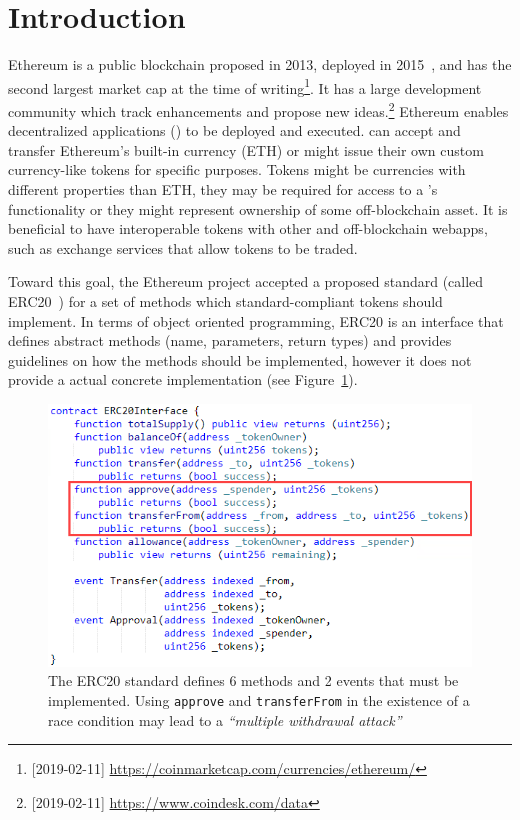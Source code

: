 
\section{Introduction}



Ethereum is a public blockchain proposed in 2013, deployed in 2015~\cite{Ref00}, and has the second largest market cap at the time of writing\footnote{[2019-02-11] \url{https://coinmarketcap.com/currencies/ethereum/}}. It has a large development community which track enhancements and propose new ideas.\footnote{[2019-02-11] \url{https://www.coindesk.com/data}} Ethereum enables decentralized applications (\dapps) to be deployed and executed. \dapps can accept and transfer Ethereum's built-in currency (ETH) or might issue their own custom currency-like tokens for specific purposes. Tokens might be currencies with different properties than ETH, they may be required for access to a \dapp's functionality or they might represent ownership of some off-blockchain asset. It is beneficial to have interoperable tokens with other \dapps and off-blockchain webapps, such as exchange services that allow tokens to be traded.

Toward this goal, the Ethereum project accepted a proposed standard (called ERC20~\cite{Ref08}) for a set of methods which standard-compliant tokens should implement. In terms of object oriented programming, ERC20 is an interface that defines abstract methods (name, parameters, return types) and provides guidelines on how the methods should be implemented, however it does not provide a actual concrete implementation (see Figure~\ref{fig:erc20api}). 

\begin{figure}[t!]
	\centering
	\includegraphics[width=1.0\linewidth]{figures/multiple_withdrawal_01.png}
	\caption{The ERC20 standard defines 6 methods and 2 events that must be implemented. Using \texttt{approve} and \texttt{transferFrom} in the existence of a race condition may lead to a \textit{``multiple withdrawal attack''}\label{fig:erc20api}}
\end{figure}

